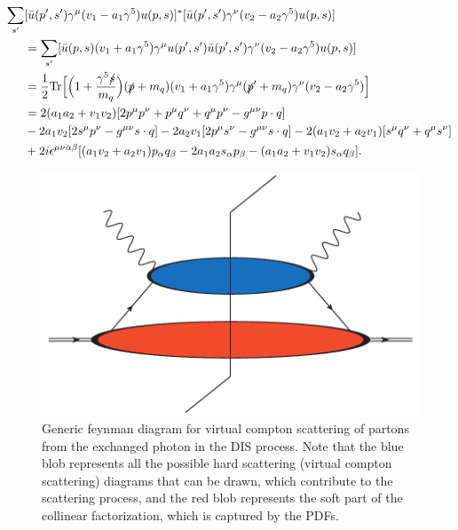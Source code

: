 \documentclass[aps,prd,amsmath,superscriptaddress,floatfix,nofootinbib]{revtex4-2}
\begin{document}
\begin{eqnarray}
    \label{eq:generic-tensor-structure}
    \begin{aligned} 
        \sum_{s'} &[ \bar{u}(p',s') \gamma^{\mu} (v_1 - a_1 \gamma^{5}) u(p,s) ]^{*}[ \bar{u}(p',s') \gamma^{\nu} (v_2 - a_2 \gamma^{5}) u(p,s) ] \\
                  &= \sum_{s'} [ \bar{u}(p,s) (v_1 + a_1 \gamma^{5}) \gamma^{\mu} u(p',s') \bar{u}(p',s') \gamma^{\nu} (v_2 - a_2 \gamma^{5}) u(p,s) ] \\
                  &= \frac{1}{2}{\rm Tr} \Big[ \Big( 1 + \frac{\gamma^{5} \slashed{s}}{m_{q}} \Big) ( \slashed{p} + m_{q} ) ( v_1 + a_1 \gamma^{5} ) \gamma^{\mu} (\slashed{p}' + m_{q} ) \gamma^{\nu} ( v_2 - a_2 \gamma^{5} ) \Big] \\
                  &= 2 ( a_1 a_2 + v_1v_2 )[ 2 p^{\mu}p^{\nu} + p^{\mu}q^{\nu} + q^{\mu}p^{\nu}  - g^{\mu\nu} p \cdot q ] \\
                  &- 2 a_1v_2 [ 2s^{\mu}p^{\nu} - g^{\mu\nu} s \cdot q ] - 2 a_2v_1 [ 2p^{\mu}s^{\nu} - g^{\mu\nu} s \cdot q ] - 2 ( a_1v_2 + a_2v_1 ) [ s^{\mu}q^{\nu} + q^{\mu}s^{\nu} ] \\
                  &+ 2i\epsilon^{\mu\nu\alpha\beta} [ ( a_1v_2 + a_2v_1 ) p_{\alpha}q_{\beta} - 2 a_1a_2 s_{\alpha}p_{\beta} - ( a_1a_2 + v_1v_2 ) s_{\alpha}q_{\beta} ]
    .\end{aligned}
\end{eqnarray}

\begin{figure}[h!tb]
\begin{center} 
    \includegraphics[width=0.4\paperwidth]{DIS_parton_model.pdf}
    \caption{Generic feynman diagram for virtual compton scattering of partons from the exchanged photon in the DIS process. Note that the blue blob represents all the possible hard scattering (virtual compton scattering) diagrams that can be drawn, which contribute to the scattering process, and the red blob represents the soft part of the collinear factorization, which is captured by the PDFs.}
    \label{fig:virtual-compton-scattering}
\end{center}
\end{figure}
\end{document}
